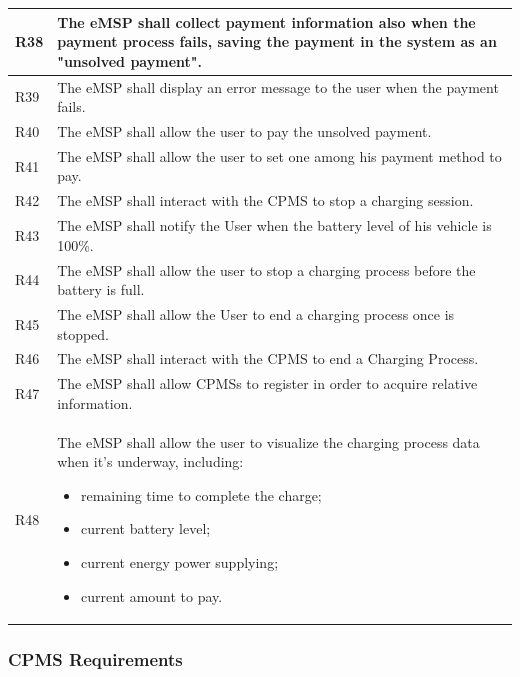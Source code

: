 \documentclass{Configuration_Files/PoliMi3i_thesis}
\begin{document}
\begin{xltabular}{\textwidth}{| >{}l | X |}
R38  &
    The eMSP shall collect payment information also when the payment process fails, saving the payment in the system as an "unsolved payment".\B\\
\hline
    
R39  &
    The eMSP shall display an error message to the user when the payment fails.\B\\
\hline
    
R40  &
    The eMSP shall allow the user to pay the unsolved payment.\B\\
\hline
    
R41  &
    The eMSP shall allow the user to set one among his payment method to pay.\B\\
\hline

R42  &
    The eMSP shall interact with the CPMS to stop a charging session.\B\\
\hline

R43  &
    The eMSP shall notify the User when the battery level of his vehicle is 100\%. \B\\
\hline

R44 &
    The eMSP shall allow the user to stop a charging process before the battery is full.\B\\
    \hline

R45 &
    The eMSP shall allow the User to end a charging process once is stopped.\B\\
\hline
    
R46 &
    The eMSP shall interact with the CPMS to end a Charging Process.\B\\
\hline
R47  &
    The eMSP shall allow CPMSs to register in order to acquire relative information. \B\\
\hline
 
R48  &
    The eMSP shall allow the user to visualize the charging process data when it’s underway, including:
    \begin{itemize}
        \item remaining time to complete the charge;
        \item current battery level;
        \item current energy power supplying;
        \item current amount to pay.
    \end{itemize}\B\\
\hline
\end{xltabular}

\subsubsection{CPMS Requirements}
\end{document}
